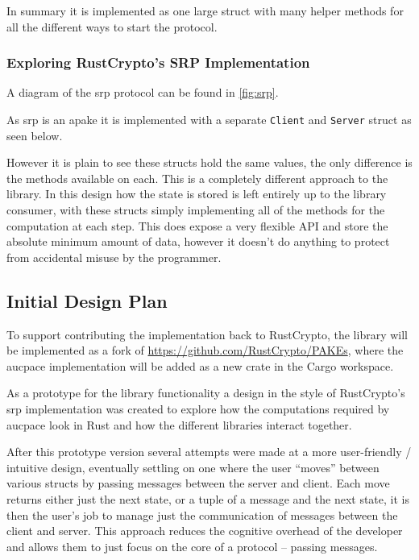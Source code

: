 In summary it is implemented as one large struct with many helper methods for all the different ways to start the protocol.

\subsubsection{Exploring RustCrypto's SRP Implementation}
A diagram of the \gls{srp} protocol can be found in \cref{fig:srp}.

As \gls{srp} is an \gls{apake} it is implemented with a separate \texttt{Client} and \texttt{Server} struct as seen below.


However it is plain to see these structs hold the same values, the only difference is the methods available on each.
This is a completely different approach to the  library.
In this design how the state is stored is left entirely up to the library consumer, with these structs simply implementing all of the methods for the computation at each step.
This does expose a very flexible API and store the absolute minimum amount of data, however it doesn't do anything to protect from accidental misuse by the programmer.

\subsection{Initial Design Plan}
To support contributing the implementation back to RustCrypto, the library will be implemented as a fork of \url{https://github.com/RustCrypto/PAKEs},
where the \gls{aucpace} implementation will be added as a new crate in the Cargo workspace.

As a prototype for the library functionality a design in the style of RustCrypto's \gls{srp} implementation was created to explore how the computations required by \gls{aucpace} look in Rust and how the different libraries interact together.

After this prototype version several attempts were made at a more user-friendly / intuitive design, eventually settling on one where the user \enquote{moves} between various structs by passing messages between the server and client.
Each move returns either just the next state, or a tuple of a message and the next state, it is then the user's job to manage just the communication of messages between the client and server.
This approach reduces the cognitive overhead of the developer and allows them to just focus on the core of a protocol -- passing messages.

